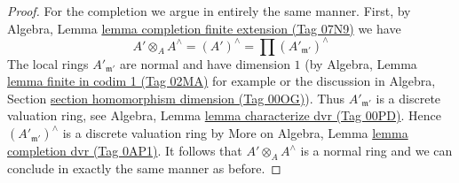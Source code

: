 \documentclass{amsart}
\theoremstyle{plain}
\theoremstyle{definition}
\theoremstyle{remark}
\numberwithin{equation}{subsection}
\begin{document}
\begin{proof}
\medskip\noindent
For the completion we argue in entirely the same manner. First,
by Algebra, Lemma \href{https://stacks.math.columbia.edu/tag/07N9}{lemma completion finite extension (Tag 07N9)} we have
$$
A' \otimes_A A^\wedge = (A')^\wedge =
\prod\nolimits (A'_{\mathfrak m'})^\wedge
$$
The local rings $A'_{\mathfrak m'}$ are normal and have dimension $1$
(by Algebra, Lemma \href{https://stacks.math.columbia.edu/tag/02MA}{lemma finite in codim 1 (Tag 02MA)} for example or
the discussion in
Algebra, Section \href{https://stacks.math.columbia.edu/tag/00OG}{section homomorphism dimension (Tag 00OG)}).
Thus $A'_{\mathfrak m'}$ is a discrete valuation ring, see
Algebra, Lemma \href{https://stacks.math.columbia.edu/tag/00PD}{lemma characterize dvr (Tag 00PD)}.
Hence $(A'_{\mathfrak m'})^\wedge$ is a discrete valuation ring
by More on Algebra, Lemma \href{https://stacks.math.columbia.edu/tag/0AP1}{lemma completion dvr (Tag 0AP1)}.
It follows that $A' \otimes_A A^\wedge$ is a normal ring and
we can conclude in exactly the same manner as before.
\end{proof}
\end{document}
